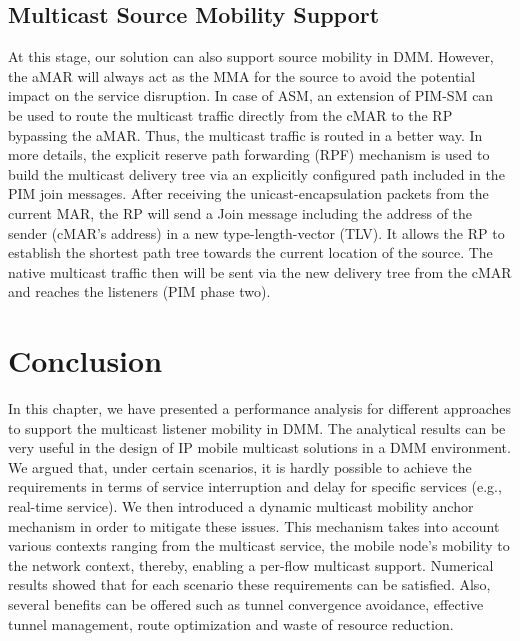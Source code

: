 \subsection{Multicast Source Mobility Support}
At this stage, our solution can also support source mobility in DMM. However, the aMAR will always act as the MMA for the source to avoid the potential impact on the service disruption. In case of ASM, an extension of PIM-SM \cite{explicit_rpf} can be used to route the multicast traffic directly from the cMAR to the RP bypassing the aMAR. Thus, the multicast traffic is routed in a better way. In more details, the explicit reserve path forwarding (RPF) mechanism is used to build the multicast delivery tree via an explicitly configured path included in the PIM join messages. After receiving the unicast-encapsulation packets from the current MAR, the RP will send a Join message including the address of the sender (cMAR's address) in a new type-length-vector (TLV). It allows the RP to establish the shortest path tree towards the current location of the source. The native multicast traffic then will be sent via the new delivery tree from the cMAR and reaches the listeners (PIM phase two).  

\section{Conclusion}\label{c10:conclusion}
In this chapter, we have presented a performance analysis for different approaches to support the multicast listener mobility in DMM. The analytical results can be very useful in the design of IP mobile multicast solutions in a DMM environment. We argued that, under certain scenarios, it is hardly possible to achieve the requirements in terms of service interruption and delay for specific services (e.g., real-time service). We then introduced a dynamic multicast mobility anchor mechanism in order to mitigate these issues. This mechanism takes into account various contexts ranging from the multicast service, the mobile node's mobility to the network context, thereby, enabling a per-flow multicast support. Numerical results showed that for each scenario these requirements can be satisfied. Also, several benefits can be offered such as tunnel convergence avoidance, effective tunnel management, route optimization and waste of resource reduction. 
